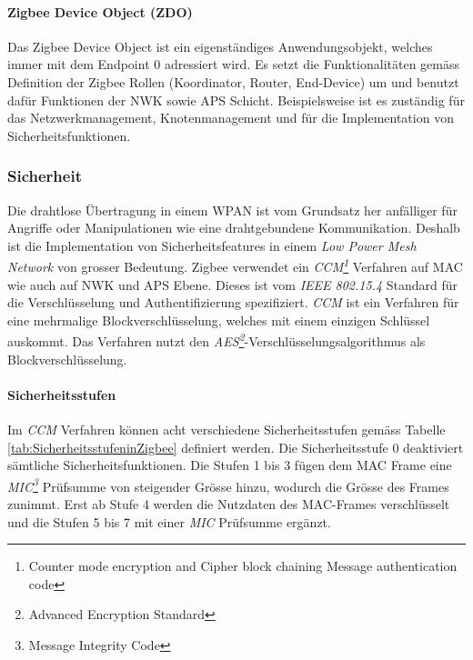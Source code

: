 \paragraph{Zigbee Device Object (ZDO)}
Das Zigbee Device Object ist ein eigenständiges Anwendungsobjekt, welches immer mit dem Endpoint 0 adressiert wird.
Es setzt die Funktionalitäten gemäss Definition der Zigbee Rollen (Koordinator, Router, End-Device) um und benutzt dafür Funktionen der NWK sowie APS Schicht.
Beispielsweise ist es zuständig für das Netzwerkmanagement, Knotenmanagement und für die Implementation von Sicherheitsfunktionen.

\subsubsection{Sicherheit}\label{subsucsec:ZigbeeSicherheit}
Die drahtlose Übertragung in einem WPAN ist vom Grundsatz her anfälliger für Angriffe oder Manipulationen wie eine drahtgebun­dene Kommunikation.
Deshalb ist die Implementation von Sicherheitsfeatures in einem \textit{Low Power Mesh Network} von grosser Bedeutung.
Zigbee verwendet ein \textit{CCM\footnote{Counter mode encryption and Cipher block chaining Message authentication code}} Verfahren auf MAC wie auch auf NWK und APS Ebene.
Dieses ist vom \textit{IEEE 802.15.4} Standard für die Verschlüsselung und Authentifizierung spezifiziert.
\textit{CCM} ist ein Verfahren für eine mehrmalige Blockverschlüsselung, welches mit einem einzigen Schlüssel auskommt.
Das Verfahren nutzt den \textit{AES\footnote{Advanced Encryption Standard}}-Verschlüsselungsalgorithmus als Blockverschlüsselung.

\paragraph{Sicherheitsstufen}
Im \textit{CCM} Verfahren können acht verschiedene Sicherheitsstufen gemäss Tabelle \ref{tab:SicherheitsstufeninZigbee} definiert werden.
Die Sicherheitsstufe 0 deaktiviert sämtliche Sicherheitsfunktionen.
Die Stufen 1 bis 3 fügen dem MAC Frame eine \textit{MIC\footnote{Message Integrity Code}} Prüfsumme von steigender Grösse hinzu, wodurch die Grösse des Frames zunimmt.
Erst ab Stufe 4 werden die Nutzdaten des MAC-Frames verschlüsselt und die Stufen 5 bis 7 mit einer \textit{MIC} Prüfsumme ergänzt. \cite[S.~334]{markus_krause_rainer_konrad_zigbee_2014}

